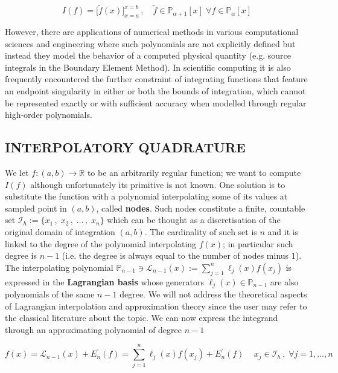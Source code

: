 \documentclass[a4paper, twosided]{book}
\begin{document}
\begin{equation}\label{eq1.2}
    I(f) = \Big[\tilde{f}(x)\Big]_{x=a}^{x=b}\,,\quad\tilde{f}\in\mathbb{P}_{\alpha+1}[x]\;\forall f\in\mathbb{P}_{\alpha}[x]
\end{equation}

\noindent
However, there are applications of numerical methods in various computational sciences and engineering where such polynomials are not explicitly defined but instead they model the behavior of a computed physical quantity (e.g. source integrals in the Boundary Element Method). In scientific computing it is also frequently encountered the further constraint of integrating functions that feature an endpoint singularity in either or both the bounds of integration, which cannot be represented exactly or with sufficient accuracy when modelled through regular high-order polynomials.

\subsection[Interpolatory quadrature]{\changefont INTERPOLATORY QUADRATURE}\label{SubSec1.2.1}

We let $f:(a,b)\to\mathbb{R}$ to be an arbitrarily regular function; we want to compute $I(f)$ although unfortunately its primitive is not known. One solution is to substitute the function with a polynomial interpolating some of its values at sampled point in $(a,b)$, called \color{poliDarkBlue} \textbf{nodes}\color{black}. Such nodes constitute a finite, countable set $\mathcal{I}_h:=\{x_1\,,\;x_2\,,\;\dots\,,\;x_{n}\}$ which can be thought as a discretisation of the original domain of integration $(a,b)$. The cardinality of such set is  $n$ and it is linked to the degree of the polynomial interpolating $f(x)$; in particular such degree is $n-1$ (i.e. the degree is always equal to the number of nodes minus $1$). The interpolating polynomial $\mathbb{P}_{n-1}\ni\mathcal{L}_{n-1}(x):=\sum_{j=1}^{n}\ell_j(x)f(x_j)$ is expressed in the \color{poliDarkBlue} \textbf{Lagrangian basis} \color{black} whose generators $\ell_j(x)\in\mathbb{P}_{n-1}$ are also polynomials of the same $n-1$ degree. We will not address the theoretical aspects of Lagrangian interpolation and approximation theory since the user may refer to the classical literature about the topic. We can now express the integrand through an approximating polynomial of degree $n-1$

\begin{equation}\label{eq1.3}
    f(x) = \mathcal{L}_{n-1}(x) + E^{'}_n(f) = \sum_{j=1}^{n}\ell_j(x)f(x_j) + E^{'}_n(f)\,\quad x_j\in\mathcal{I}_h\,,\;\forall j=1,...,n
\end{equation}
\end{document}
